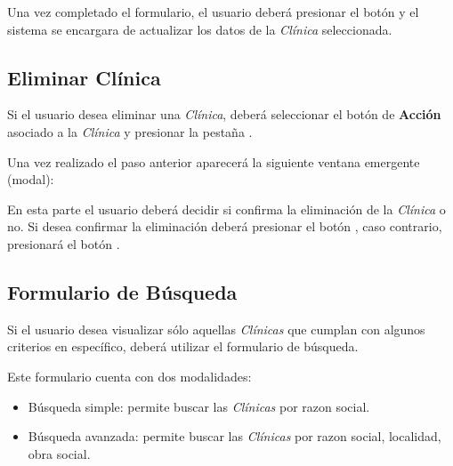 \documentclass[a4paper,10pt,spanish]{sphinxmanual}
\begin{document}
Una vez completado el formulario, el usuario deberá presionar el botón  y el sistema se encargara de actualizar los datos de la \emph{Clínica} seleccionada.


\subsection{Eliminar Clínica}
\label{clinicas:id4}\label{clinicas:eliminar-clinica}
Si el usuario desea eliminar una \emph{Clínica}, deberá seleccionar el botón de \textbf{Acción} asociado a la \emph{Clínica} y presionar la pestaña .


Una vez realizado el paso anterior aparecerá la siguiente ventana emergente (modal):


En esta parte el usuario deberá decidir si confirma la eliminación de la \emph{Clínica} o no. Si desea confirmar la eliminación deberá presionar el botón , caso contrario, presionará el botón .


\subsection{Formulario de Búsqueda}
\label{clinicas:formulario-busqueda-clinica}\label{clinicas:formulario-de-busqueda}
Si el usuario desea visualizar sólo aquellas \emph{Clínicas} que cumplan con algunos criterios en específico, deberá utilizar el formulario de búsqueda.


Este formulario cuenta con dos modalidades:
\begin{itemize}
\item {} 
Búsqueda simple: permite buscar las \emph{Clínicas} por razon social.

\item {} 
Búsqueda avanzada: permite buscar las \emph{Clínicas} por razon social, localidad, obra social.

\end{itemize}
\end{document}
